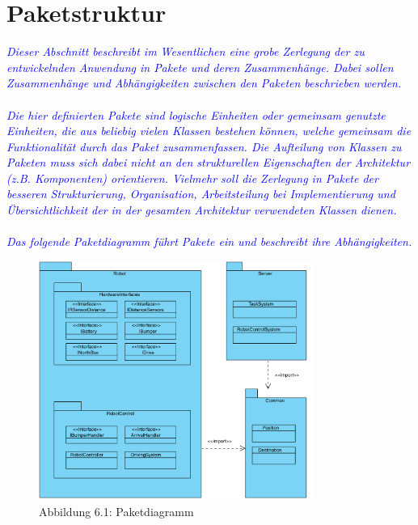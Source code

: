 \section{Paketstruktur}
\textcolor{blue}{\textit{Dieser Abschnitt beschreibt im Wesentlichen eine grobe Zerlegung der zu entwickelnden Anwendung in Pakete und deren Zusammenhänge. Dabei sollen Zusammenhänge und Abhängigkeiten zwischen den Paketen beschrieben werden.\\\\
Die hier definierten Pakete sind logische Einheiten oder gemeinsam genutzte Einheiten, die aus beliebig vielen Klassen bestehen können, welche gemeinsam die Funktionalität durch das Paket zusammenfassen. Die Aufteilung von Klassen zu Paketen muss sich dabei nicht an den strukturellen Eigenschaften der Architektur (z.B. Komponenten) orientieren. Vielmehr soll die Zerlegung in Pakete der besseren Strukturierung, Organisation, Arbeitsteilung bei Implementierung und Übersichtlichkeit der in der gesamten Architektur verwendeten Klassen dienen.\\\\
Das folgende Paketdiagramm führt Pakete ein und beschreibt ihre Abhängigkeiten. 
}}

\begin{figure}[H]
\centering
\includegraphics[width=0.8\textwidth]{../images/Iteration0_Entwurf_6_Paketdiagramm}
\caption{Abbildung 6.1: Paketdiagramm}
\label{Paketstruktur}
\end{figure}
